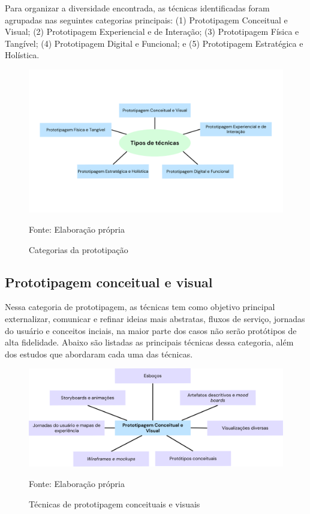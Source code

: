 Para organizar a diversidade encontrada, as técnicas identificadas foram agrupadas nas seguintes categorias principais: (1) Prototipagem Conceitual e Visual; (2) Prototipagem Experiencial e de Interação; (3) Prototipagem Física e Tangível; (4) Prototipagem Digital e Funcional; e (5) Prototipagem Estratégica e Holística.


\begin{figure}[H]
	\centering
	\includegraphics[width=1\linewidth]{figuras/tipos-tecnicas}
	\caption{Categorias da prototipação}
	Fonte: Elaboração própria
	\label{fig:categorias-prototipacao}
\end{figure}

\subsection{Prototipagem conceitual e visual}

Nessa categoria de prototipagem, as técnicas tem como objetivo principal externalizar, comunicar e refinar ideias mais abstratas, fluxos de serviço, jornadas do usuário e conceitos inciais, na maior parte dos casos não serão protótipos de alta fidelidade. Abaixo são listadas as principais técnicas dessa categoria, além dos estudos que abordaram cada uma das técnicas.

\begin{figure}[H]
	\centering
	\includegraphics[width=1\linewidth]{figuras/conceitual-visual}
	\caption{Técnicas de prototipagem conceituais e visuais}
	Fonte: Elaboração própria
	\label{fig:categorias-prototipacao}
\end{figure}


